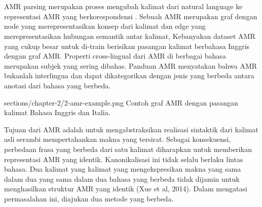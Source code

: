 \section{}

\gls{AMR} parsing merupakan proses mengubah kalimat dari natural language ke representasi \gls{AMR} yang berkorespondensi .
Sebuah \gls{AMR} merupakan graf dengan node yang merepresentasikan konsep dari kalimat dan edge yang merepresentasikan hubungan semantik antar kalimat, Kebanyakan dataset \gls{AMR} yang cukup besar untuk di-train berisikan pasangan kalimat berbahasa Inggris dengan graf \gls{AMR}.
Properti cross-lingual dari \gls{AMR} di berbagai bahasa merupakan subjek yang sering dibahas.
Panduan \gls{AMR} menyatakan bahwa \gls{AMR} bukanlah interlingua  dan dapat dikategorikan dengan jenis yang berbeda antara anotasi dari bahasa yang berbeda.

  {sections/chapter-2/2-amr-example.png}
  {Contoh graf \gls{AMR} dengan pasangan kalimat Bahasa Inggris dan Italia.}

Tujuan dari \gls{AMR} adalah untuk mengabstraksikan realisasi sintaktik dari kalimat asli serambi mempertahankan makna yang tersirat.
Sebagai konsekuensi, perbedaan frasa yang berbeda dari satu kalimat diharapkan untuk memberikan representasi \gls{AMR} yang identik.
Kanonikalisasi ini tidak selalu berlaku lintas bahasa.
Dua kalimat yang kalimat yang mengekspresikan makna yang sama dalam dua yang sama dalam dua bahasa yang berbeda tidak dijamin untuk menghasilkan struktur \gls{AMR} yang identik (Xue et al, 2014).
Dalam mengatasi permasalahan ini, diajukan dua metode yang berbeda.

